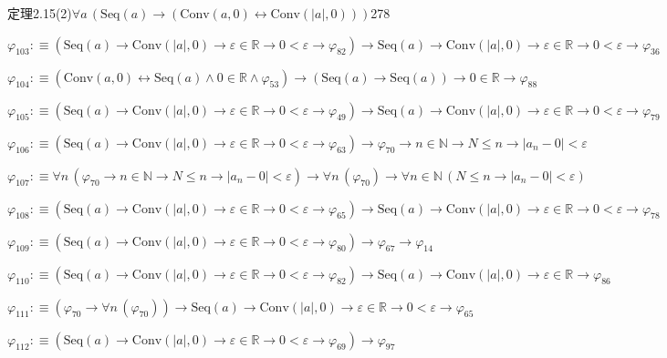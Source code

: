\begin{fullproof}{定理2.15(2)}{$\forall a\,(\mathrm{Seq}(a) \to (\mathrm{Conv}(a,0) \leftrightarrow \mathrm{Conv}(\lvert a \rvert,0)))$}{278}
\begin{abbrevlist}
\item $\varphi_{103} :\equiv (\mathrm{Seq}(a) \to \mathrm{Conv}(\lvert a \rvert,0) \to \varepsilon \in \mathbb{R} \to 0 < \varepsilon \to \varphi_{82}) \to \mathrm{Seq}(a) \to \mathrm{Conv}(\lvert a \rvert,0) \to \varepsilon \in \mathbb{R} \to 0 < \varepsilon \to \varphi_{36}$
\item $\varphi_{104} :\equiv (\mathrm{Conv}(a,0) \leftrightarrow \mathrm{Seq}(a) \land 0 \in \mathbb{R} \land \varphi_{53}) \to (\mathrm{Seq}(a) \to \mathrm{Seq}(a)) \to 0 \in \mathbb{R} \to \varphi_{88}$
\item $\varphi_{105} :\equiv (\mathrm{Seq}(a) \to \mathrm{Conv}(\lvert a \rvert,0) \to \varepsilon \in \mathbb{R} \to 0 < \varepsilon \to \varphi_{49}) \to \mathrm{Seq}(a) \to \mathrm{Conv}(\lvert a \rvert,0) \to \varepsilon \in \mathbb{R} \to 0 < \varepsilon \to \varphi_{79}$
\item $\varphi_{106} :\equiv (\mathrm{Seq}(a) \to \mathrm{Conv}(\lvert a \rvert,0) \to \varepsilon \in \mathbb{R} \to 0 < \varepsilon \to \varphi_{63}) \to \varphi_{70} \to n \in \mathbb{N} \to N \leq n \to \lvert a_{n} - 0 \rvert < \varepsilon$
\item $\varphi_{107} :\equiv \forall n\,(\varphi_{70} \to n \in \mathbb{N} \to N \leq n \to \lvert a_{n} - 0 \rvert < \varepsilon) \to \forall n\,(\varphi_{70}) \to \forall n \in \mathbb{N}\,(N \leq n \to \lvert a_{n} - 0 \rvert < \varepsilon)$
\item $\varphi_{108} :\equiv (\mathrm{Seq}(a) \to \mathrm{Conv}(\lvert a \rvert,0) \to \varepsilon \in \mathbb{R} \to 0 < \varepsilon \to \varphi_{65}) \to \mathrm{Seq}(a) \to \mathrm{Conv}(\lvert a \rvert,0) \to \varepsilon \in \mathbb{R} \to 0 < \varepsilon \to \varphi_{78}$
\item $\varphi_{109} :\equiv (\mathrm{Seq}(a) \to \mathrm{Conv}(\lvert a \rvert,0) \to \varepsilon \in \mathbb{R} \to 0 < \varepsilon \to \varphi_{80}) \to \varphi_{67} \to \varphi_{14}$
\item $\varphi_{110} :\equiv (\mathrm{Seq}(a) \to \mathrm{Conv}(\lvert a \rvert,0) \to \varepsilon \in \mathbb{R} \to 0 < \varepsilon \to \varphi_{82}) \to \mathrm{Seq}(a) \to \mathrm{Conv}(\lvert a \rvert,0) \to \varepsilon \in \mathbb{R} \to \varphi_{86}$
\item $\varphi_{111} :\equiv (\varphi_{70} \to \forall n\,(\varphi_{70})) \to \mathrm{Seq}(a) \to \mathrm{Conv}(\lvert a \rvert,0) \to \varepsilon \in \mathbb{R} \to 0 < \varepsilon \to \varphi_{65}$
\item $\varphi_{112} :\equiv (\mathrm{Seq}(a) \to \mathrm{Conv}(\lvert a \rvert,0) \to \varepsilon \in \mathbb{R} \to 0 < \varepsilon \to \varphi_{69}) \to \varphi_{97}$

\end{abbrevlist}
\end{fullproof}
